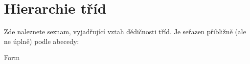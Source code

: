 \section{Hierarchie tříd}
Zde naleznete seznam, vyjadřující vztah dědičnosti tříd. Je seřazen přibližně (ale ne úplně) podle abecedy\+:\begin{DoxyCompactList}
\item Form\begin{DoxyCompactList}
\item {}
\end{DoxyCompactList}
\item {}
\end{DoxyCompactList}
